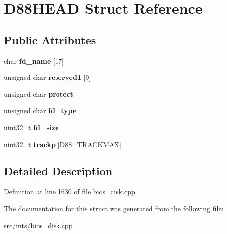 \hypertarget{structD88HEAD}{\section{D88\-H\-E\-A\-D Struct Reference}
\label{structD88HEAD}
}
\subsection*{Public Attributes}
\begin{DoxyCompactItemize}
\item 
\hypertarget{structD88HEAD_a2c0d333ef195411bba5037f50fd84851}{char {\bfseries fd\-\_\-name} \mbox{[}17\mbox{]}}\label{structD88HEAD_a2c0d333ef195411bba5037f50fd84851}

\item 
\hypertarget{structD88HEAD_a84361ff288bb15c2b0d6f0178ac92307}{unsigned char {\bfseries reserved1} \mbox{[}9\mbox{]}}\label{structD88HEAD_a84361ff288bb15c2b0d6f0178ac92307}

\item 
\hypertarget{structD88HEAD_ae3bd557d9f3ea266a37e5d8e35808169}{unsigned char {\bfseries protect}}\label{structD88HEAD_ae3bd557d9f3ea266a37e5d8e35808169}

\item 
\hypertarget{structD88HEAD_a1d70d36b2a1c7de70b2ea326c60bcbb0}{unsigned char {\bfseries fd\-\_\-type}}\label{structD88HEAD_a1d70d36b2a1c7de70b2ea326c60bcbb0}

\item 
\hypertarget{structD88HEAD_a482cd78a7bd79559ba4982fb5bdadf4e}{uint32\-\_\-t {\bfseries fd\-\_\-size}}\label{structD88HEAD_a482cd78a7bd79559ba4982fb5bdadf4e}

\item 
\hypertarget{structD88HEAD_a7cc91cbeb7f776053cb525dccc7c8abe}{uint32\-\_\-t {\bfseries trackp} \mbox{[}D88\-\_\-\-T\-R\-A\-C\-K\-M\-A\-X\mbox{]}}\label{structD88HEAD_a7cc91cbeb7f776053cb525dccc7c8abe}

\end{DoxyCompactItemize}


\subsection{Detailed Description}


Definition at line 1630 of file bios\-\_\-disk.\-cpp.



The documentation for this struct was generated from the following file\-:\begin{DoxyCompactItemize}
\item 
src/ints/bios\-\_\-disk.\-cpp\end{DoxyCompactItemize}
